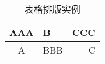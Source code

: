 \begin{table}
\centering
\caption{表格排版实例}
\label{tab1}
\begin{tabular}{|c|l|r|}
\hline
AAA&B&CCC\\
\hline
A&BBB&C\\
\hline
\end{tabular}
\end{table}